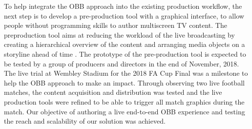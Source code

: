 \documentclass[sigchi-a, authorversion]{acmart}
\begin{document}
To help integrate the OBB approach into the existing
production workflow, the next step is to develop a pre-production tool with a
graphical interface, to allow people without programming skills to author
multiscreen TV content. The preproduction tool aims at reducing the workload of
the live broadcasting by creating a hierarchical overview of the content and
arranging media objects on a storyline ahead of time \cite{Li:2018_TVX}. The
prototype of the pre-production tool is expected to be tested by a group of
producers and directors in the end of November, 2018. The live trial at Wembley Stadium for the 2018 FA Cup Final was a
milestone to help the OBB approach to make an impact. Through observing two live football matches, the
content acquisition and distribution was tested and the live production tools
were refined to be able to trigger all match graphics during the match.
Our objective of authoring a live end-to-end OBB experience and testing the
reach and scalability of our solution was achieved.



\end{document}
